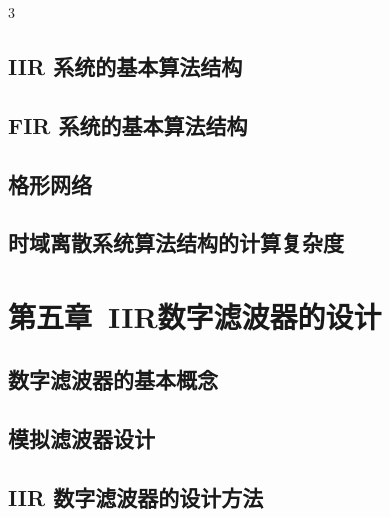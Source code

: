 \documentclass[10pt, a4paper, landscape]{article}
\begin{document}
\begin{multicols*}{3}
\subsection{IIR 系统的基本算法结构}

\subsection{FIR 系统的基本算法结构}

\subsection{格形网络}

\subsection{时域离散系统算法结构的计算复杂度}

\section{第五章\ IIR数字滤波器的设计}

\subsection{数字滤波器的基本概念}

\subsection{模拟滤波器设计}

\subsection{IIR 数字滤波器的设计方法}



\end{multicols*}
\end{document}

